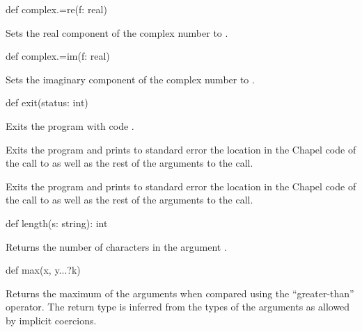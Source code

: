 \begin{protohead}
def complex.=re(f: real)
\end{protohead}
\begin{protobody}
Sets the real component of the complex number to .
\end{protobody}

\begin{protohead}
def complex.=im(f: real)
\end{protohead}
\begin{protobody}
Sets the imaginary component of the complex number to .
\end{protobody}

\begin{protohead}
def exit(status: int)
\end{protohead}
\begin{protobody}
Exits the program with code .
\end{protobody}

\begin{protohead}
def halt() {
\end{protohead}
\begin{protobody}
Exits the program and prints to standard error the location in the
Chapel code of the call to  as well as the rest of the
arguments to the call.
\end{protobody}

\begin{protohead}
def halt(args ...?numArgs) {
\end{protohead}
\begin{protobody}
Exits the program and prints to standard error the location in the
Chapel code of the call to  as well as the rest of the
arguments to the call.
\end{protobody}

\begin{protohead}
def length(s: string): int
\end{protohead}
\begin{protobody}
Returns the number of characters in the argument .
\end{protobody}

\begin{protohead}
def max(x, y...?k)
\end{protohead}
\begin{protobody}
Returns the maximum of the arguments when compared using the
``greater-than'' operator.  The return type is inferred from the types
of the arguments as allowed by implicit coercions.
\end{protobody}

